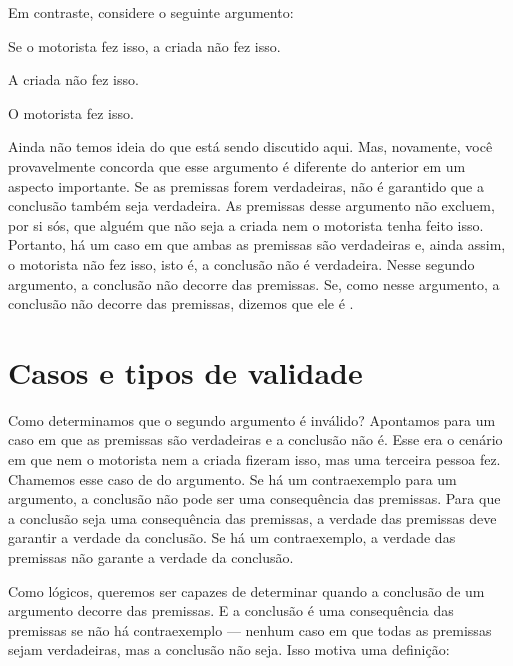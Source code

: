 Em contraste, considere o seguinte argumento:
\begin{earg}\label{argMaidDriver}
	\item[] Se o motorista fez isso, a criada não fez isso.
	\item[] A criada não fez isso.
	\item[\texttherefore] O motorista fez isso.
\end{earg}
Ainda não temos ideia do que está sendo discutido aqui. Mas, novamente, você provavelmente concorda que esse argumento é diferente do anterior em um aspecto importante. Se as premissas forem verdadeiras, não é garantido que a conclusão também seja verdadeira. As premissas desse argumento não excluem, por si sós, que alguém que não seja a criada nem o motorista tenha feito isso. Portanto, há um caso em que ambas as premissas são verdadeiras e, ainda assim, o motorista não fez isso, isto é, a conclusão não é verdadeira. Nesse segundo argumento, a conclusão não decorre das premissas. Se, como nesse argumento, a conclusão não decorre das premissas, dizemos que ele é .

\section{Casos e tipos de validade}

Como determinamos que o segundo argumento é inválido? Apontamos para um caso em que as premissas são verdadeiras e a conclusão não é. Esse era o cenário em que nem o motorista nem a criada fizeram isso, mas uma terceira pessoa fez. Chamemos esse caso de  do argumento. Se há um contraexemplo para um argumento, a conclusão não pode ser uma consequência das premissas. Para que a conclusão seja uma consequência das premissas, a verdade das premissas deve garantir a verdade da conclusão. Se há um contraexemplo, a verdade das premissas não garante a verdade da conclusão.

Como lógicos, queremos ser capazes de determinar quando a conclusão de um argumento decorre das premissas. E a conclusão é uma consequência das premissas se não há contraexemplo — nenhum caso em que todas as premissas sejam verdadeiras, mas a conclusão não seja. Isso motiva uma definição:


